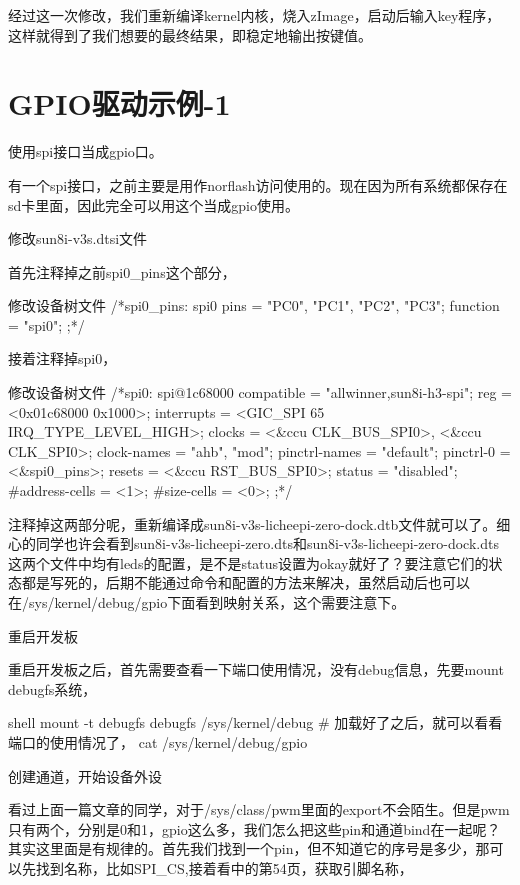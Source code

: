\documentclass[lang=cn,newtx,10pt,scheme=chinese]{elegantbook}
\begin{document}
经过这一次修改，我们重新编译kernel内核，烧入zImage，启动后输入key程序，这样就得到了我们想要的最终结果，即稳定地输出按键值。

\chapter{GPIO驱动示例-1}

使用spi接口当成gpio口。

有一个spi接口，之前主要是用作norflash访问使用的。现在因为所有系统都保存在sd卡里面，因此完全可以用这个当成gpio使用。

修改sun8i-v3s.dtsi文件

首先注释掉之前spi0\_pins这个部分，

\begin{mycode}{修改设备树文件}
/*spi0_pins: spi0 {
    pins = "PC0", "PC1", "PC2", "PC3";
    function = "spi0";
};*/
\end{mycode}

接着注释掉spi0，

\begin{mycode}{修改设备树文件}
/*spi0: spi@1c68000 {
    compatible = "allwinner,sun8i-h3-spi";
    reg = <0x01c68000 0x1000>;
    interrupts = <GIC_SPI 65 IRQ_TYPE_LEVEL_HIGH>;
    clocks = <&ccu CLK_BUS_SPI0>, <&ccu CLK_SPI0>;
    clock-names = "ahb", "mod";
    pinctrl-names = "default";
    pinctrl-0 = <&spi0_pins>;
    resets = <&ccu RST_BUS_SPI0>;
    status = "disabled";
    #address-cells = <1>;
    #size-cells = <0>;
};*/
\end{mycode}

注释掉这两部分呢，重新编译成sun8i-v3s-licheepi-zero-dock.dtb文件就可以了。细心的同学也许会看到sun8i-v3s-licheepi-zero.dts和sun8i-v3s-licheepi-zero-dock.dts这两个文件中均有leds的配置，是不是status设置为okay就好了？要注意它们的状态都是写死的，后期不能通过命令和配置的方法来解决，虽然启动后也可以在/sys/kernel/debug/gpio下面看到映射关系，这个需要注意下。

重启开发板

重启开发板之后，首先需要查看一下端口使用情况，没有debug信息，先要mount debugfs系统，

\begin{mycode}{shell}
mount -t debugfs debugfs /sys/kernel/debug
# 加载好了之后，就可以看看端口的使用情况了，
cat /sys/kernel/debug/gpio
\end{mycode}

创建通道，开始设备外设

看过上面一篇文章的同学，对于/sys/class/pwm里面的export不会陌生。但是pwm只有两个，分别是0和1，gpio这么多，我们怎么把这些pin和通道bind在一起呢？其实这里面是有规律的。首先我们找到一个pin，但不知道它的序号是多少，那可以先找到名称，比如SPI\_CS,接着看中的第54页，获取引脚名称，
\end{document}
